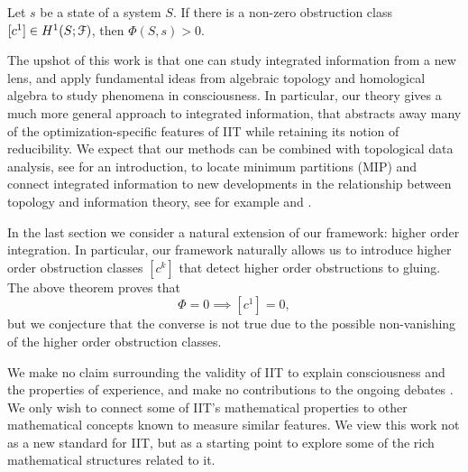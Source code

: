 \begin{theorem}
    Let $s$ be a state of a system $S$. If there is a non-zero obstruction class $[c^1] \in H^1(S;\EuScript{F})$, then $\Phi(S,s)>0$. 
\end{theorem}

The upshot of this work is that one can study integrated information from a new lens, and apply fundamental ideas from algebraic topology and homological algebra to study phenomena in consciousness. In particular, our theory gives a much more general approach to integrated information, that abstracts away many of the optimization-specific features of IIT while retaining its notion of reducibility. We expect that our methods can be combined with topological data analysis, see \citeme for an introduction, to locate minimum partitions (MIP) and connect integrated information to new developments in the relationship between topology and information theory, see for example \citeme and \citeme. 

In the last section we consider a natural extension of our framework: higher order integration. In particular, our framework naturally allows us to introduce higher order obstruction classes $[c^k]$ that detect higher order obstructions to gluing. The above theorem proves that 
\[\Phi = 0  \implies [c^1] = 0,\]
but we conjecture that the converse is not true due to the possible non-vanishing of the higher order obstruction classes.  

We make no claim surrounding the validity of IIT to explain consciousness and the properties of experience, and make no contributions to the ongoing debates \citeme. We only wish to connect some of IIT's mathematical properties to other mathematical concepts known to measure similar features. We view this work not as a new standard for IIT, but as a starting point to explore some of the rich mathematical structures related to it. 